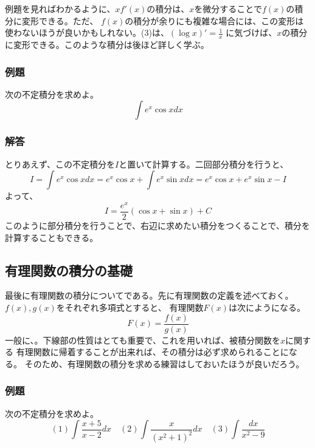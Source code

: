\documentclass[a4j,dvipdfmx]{jsarticle}
\begin{document}
例題を見ればわかるように、$xf'(x)$の積分は、$x$を微分することで$f(x)$の積分に変形できる。ただ、
$f(x)$の積分が余りにも複雑な場合には、この変形は使わないほうが良いかもしれない。(3)は、$(\log x)'=\frac{1}{x}$
に気づけば、$x$の積分に変形できる。このような積分は後ほど詳しく学ぶ。
\subsubsection{例題}
次の不定積分を求めよ。
\begin{equation*}
    \int e^x \cos xdx
\end{equation*}
\subsubsection*{解答}

とりあえず、この不定積分を$I$と置いて計算する。二回部分積分を行うと、
\begin{equation*}
    I=\int e^x \cos xdx=e^x\cos x + \int e^x \sin xdx=e^x\cos x+e^x \sin x-I 
\end{equation*}
よって、
\begin{equation*}
    I=\frac{e^x}{2}(\cos x+\sin x)+C
\end{equation*}
このように部分積分を行うことで、右辺に求めたい積分をつくることで、積分を計算することもできる。
\newpage
\subsection{有理関数の積分の基礎}
最後に有理関数の積分についてである。先に有理関数の定義を述べておく。$f(x),g(x)$をそれぞれ多項式とすると、
有理関数$F(x)$は次にようになる。
\begin{equation*}
    F(x)=\frac{f(x)}{g(x)}
\end{equation*}
一般に、。下線部の性質はとても重要で、これを用いれば、被積分関数を$x$に関する
有理関数に帰着することが出来れば、その積分は必ず求められることになる。
そのため、有理関数の積分を求める練習はしておいたほうが良いだろう。
\subsubsection{例題}
次の不定積分を求めよ。
\begin{equation*}
    (1)\int \frac{x+5}{x-2}dx\quad(2)\int \frac{x}{(x^2+1)^2}dx\quad(3)\int \frac{dx}{x^2-9}
\end{equation*}
\end{document}
